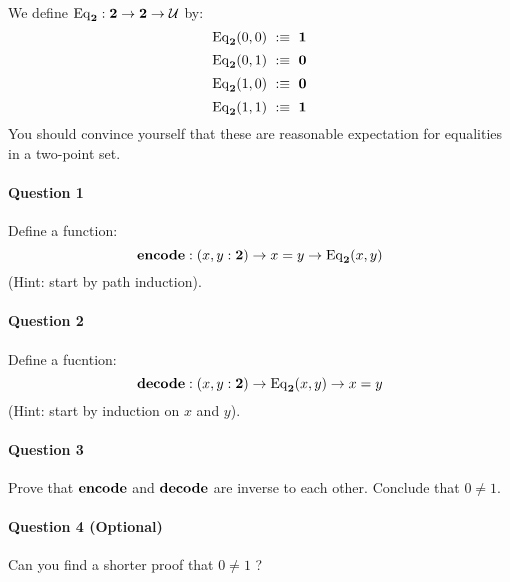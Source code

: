 \documentclass{article}[6pt]%
\newcommand{\U}{{\mathcal U}}
\renewcommand{\r}{\rightarrow}
\newcommand{\one}{{\bf 1}}
\newcommand{\zero}{{\bf 0}}
\newcommand{\two}{{\bf 2}}
\newcommand{\Eq}{\mathrm{Eq}}
\newcommand{\encode}{\mathrm{\bf encode}}
\newcommand{\decode}{\mathrm{\bf decode}}
\begin{document}
\begin{Exercise}[title={The type of booleans}]

We define $\Eq_\two : \two \r \two \r \U$ by:
\[\Eq_\two(0,0) \ :\equiv \ \one\]
\[\Eq_\two(0,1) \ :\equiv \ \zero\]
\[\Eq_\two(1,0) \ :\equiv \ \zero\]
\[\Eq_\two(1,1) \ :\equiv \ \one\]
You should convince yourself that these are reasonable expectation for equalities in a two-point set.

\paragraph{Question 1} Define a function:
\[\encode : (x,y:\two) \r x=y \r \Eq_\two(x,y)\]
(Hint: start by path induction).

\paragraph{Question 2} Define a fucntion:
\[\decode : (x,y:\two) \r \Eq_\two(x,y)\r x=y\]
(Hint: start by induction on $x$ and $y$).

\paragraph{Question 3} Prove that $\encode$ and $\decode$ are inverse to each other. Conclude that $0\neq 1$.


\paragraph{Question 4 (Optional)} Can you find a shorter proof that $0\neq 1$ ? 

\end{Exercise}
\end{document}
